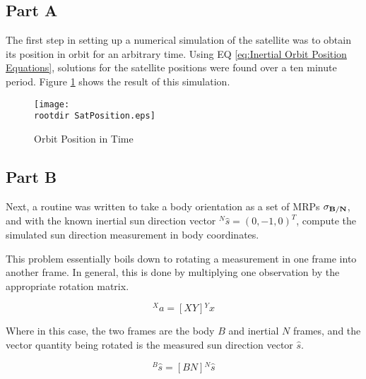 \documentclass[11pt]{aiaa-tc}%
\newcommand{\rootdir}{./Figures/}
\begin{document}
\subsection{Part A}
The first step in setting up a numerical simulation of the satellite was to obtain its position in orbit for an arbitrary time. Using EQ \ref{eq:Inertial Orbit Position Equations}, solutions for the satellite positions were found over a ten minute period. Figure \ref{fig:Satellite Position} shows the result of this simulation. 

\begin{centering}
	\begin{figure}[Hh]
		\texttt{[image: \\rootdir SatPosition.eps]}
		\caption{Orbit Position in Time}
		\label{fig:Satellite Position}
	\end{figure}
\end{centering}






\subsection{Part B}
\label{sec:Sun}
Next, a routine was written to take a body orientation as a set of MRPs $\bf{\sigma}_{B/N}$, and with the known inertial sun direction vector $^N\hat{s}=(0,-1,0)^T$, compute the simulated sun direction measurement in body coordinates. 

This problem essentially boils down to rotating a measurement in one frame into another frame. In general, this is done by multiplying one observation by the appropriate rotation matrix. 

\begin{displaymath}
	^Xa = [XY] {^Yx}
\end{displaymath}

Where in this case, the two frames are the body $B$ and inertial $N$ frames, and the vector quantity being rotated is the measured sun direction vector $\hat{s}$.

\begin{displaymath}
	^B\hat{s} = [BN] {^N\hat{s}}
\end{displaymath}
\end{document}
